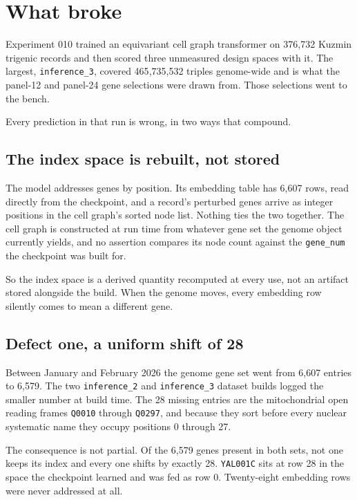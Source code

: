 
\section{What broke}
\label{sec:broke}

Experiment 010 trained an equivariant cell graph transformer on 376{,}732 Kuzmin
trigenic records and then scored three unmeasured design spaces with it. The
largest, \texttt{inference\_3}, covered 465{,}735{,}532 triples genome-wide and
is what the panel-12 and panel-24 gene selections were drawn from. Those
selections went to the bench.

Every prediction in that run is wrong, in two ways that compound.

\subsection{The index space is rebuilt, not stored}
\label{sec:rebuilt}

The model addresses genes by position. Its embedding table has 6{,}607 rows, read
directly from the checkpoint, and a record's perturbed genes arrive as integer
positions in the cell graph's sorted node list. Nothing ties the two together.
The cell graph is constructed at run time from whatever gene set the genome
object currently yields, and no assertion compares its node count against the
\texttt{gene\_num} the checkpoint was built for.

So the index space is a derived quantity recomputed at every use, not an artifact
stored alongside the build. When the genome moves, every embedding row silently
comes to mean a different gene.

\subsection{Defect one, a uniform shift of 28}

Between January and February 2026 the genome gene set went from 6{,}607 entries
to 6{,}579. The two \texttt{inference\_2} and \texttt{inference\_3} dataset builds
logged the smaller number at build time. The 28 missing entries are the
mitochondrial open reading frames \texttt{Q0010} through \texttt{Q0297}, and
because they sort before every nuclear systematic name they occupy positions 0
through 27.

The consequence is not partial. Of the 6{,}579 genes present in both sets, not
one keeps its index and every one shifts by exactly 28. \texttt{YAL001C} sits at
row 28 in the space the checkpoint learned and was fed as row 0. Twenty-eight
embedding rows were never addressed at all.

